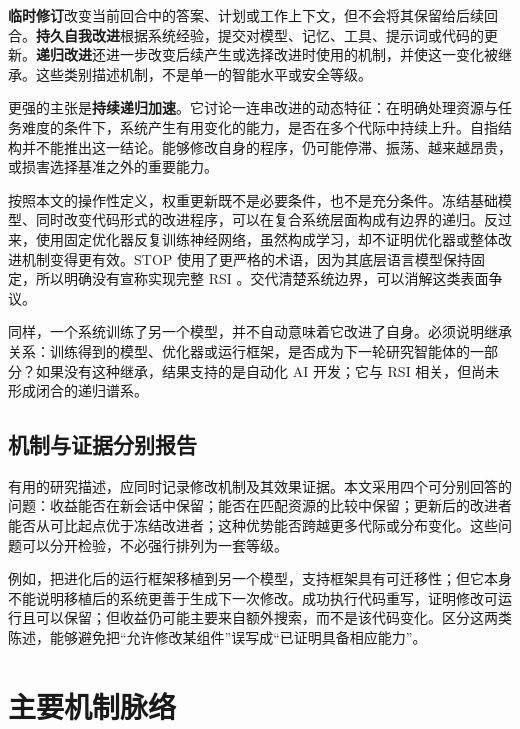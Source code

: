 \documentclass[11pt,,]{article}
\begin{document}
\textbf{临时修订}改变当前回合中的答案、计划或工作上下文，但不会将其保留给后续回合。\textbf{持久自我改进}根据系统经验，提交对模型、记忆、工具、提示词或代码的更新。\textbf{递归改进}还进一步改变后续产生或选择改进时使用的机制，并使这一变化被继承。这些类别描述机制，不是单一的智能水平或安全等级。

更强的主张是\textbf{持续递归加速}。它讨论一连串改进的动态特征：在明确处理资源与任务难度的条件下，系统产生有用变化的能力，是否在多个代际中持续上升。自指结构并不能推出这一结论。能够修改自身的程序，仍可能停滞、振荡、越来越昂贵，或损害选择基准之外的重要能力。

按照本文的操作性定义，权重更新既不是必要条件，也不是充分条件。冻结基础模型、同时改变代码形式的改进程序，可以在复合系统层面构成有边界的递归。反过来，使用固定优化器反复训练神经网络，虽然构成学习，却不证明优化器或整体改进机制变得更有效。STOP
使用了更严格的术语，因为其底层语言模型保持固定，所以明确没有宣称实现完整
RSI \citep{stop2023}。交代清楚系统边界，可以消解这类表面争议。

同样，一个系统训练了另一个模型，并不自动意味着它改进了自身。必须说明继承关系：训练得到的模型、优化器或运行框架，是否成为下一轮研究智能体的一部分？如果没有这种继承，结果支持的是自动化
AI 开发；它与 RSI 相关，但尚未形成闭合的递归谱系。

\hypertarget{ux673aux5236ux4e0eux8bc1ux636eux5206ux522bux62a5ux544a}{%
\subsection{机制与证据分别报告}\label{ux673aux5236ux4e0eux8bc1ux636eux5206ux522bux62a5ux544a}}

有用的研究描述，应同时记录修改机制及其效果证据。本文采用四个可分别回答的问题：收益能否在新会话中保留；能否在匹配资源的比较中保留；更新后的改进者能否从可比起点优于冻结改进者；这种优势能否跨越更多代际或分布变化。这些问题可以分开检验，不必强行排列为一套等级。

例如，把进化后的运行框架移植到另一个模型，支持框架具有可迁移性；但它本身不能说明移植后的系统更善于生成下一次修改。成功执行代码重写，证明修改可运行且可以保留；但收益仍可能主要来自额外搜索，而不是该代码变化。区分这两类陈述，能够避免把``允许修改某组件''误写成``已证明具备相应能力''。

\hypertarget{ux4e3bux8981ux673aux5236ux8109ux7edc}{%
\section{主要机制脉络}\label{ux4e3bux8981ux673aux5236ux8109ux7edc}}
\end{document}
